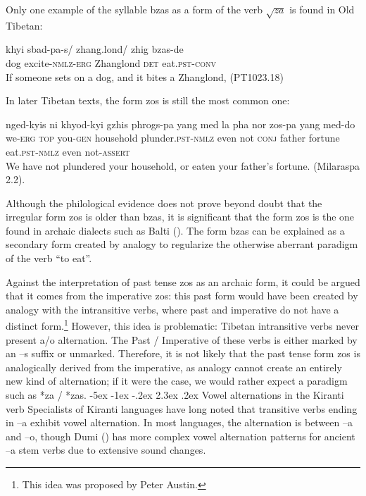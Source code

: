 \documentclass[oldfontcommands,twoside,a4paper,12pt]{memoir}
\makeatletter
\newcommand{\ipa}[1]{{\phon #1}}
\newcommand{\assert}{\textsc{assert}}
\newcommand{\conj}{\textsc{conj}}
\newcommand{\conv}{\textsc{conv}}
\newcommand{\detm}{\textsc{det}}
\newcommand{\erg}{\textsc{erg}}
\newcommand{\gen}{\textsc{gen}}
\newcommand{\nmlz}{\textsc{nmlz}}
\newcommand{\pst}{\textsc{pst}}
\newcommand{\topic}{\textsc{top}}
\newcommand{\racine}[1]{\begin{math}\sqrt{#1}\end{math}}
\newcommand{\titre}{}
\renewcommand\section{\@startsection{section}{0}{\z@}%
                                   {-5ex \@plus -1ex \@minus -.2ex}%
                                   {2.3ex \@plus.2ex}%
                                   {\flushleft\large\bfseries}}
\makeatother
\begin{document}
Only one example of the syllable \ipa{bzas} as a form of the verb \racine{za} is found in Old Tibetan:
\begin{exe}
\ex \label{bzas}
\gll khyi sbad-pa-s/ zhang.lond/ zhig bzas-de \\
	dog excite-\nmlz{}-\erg{} Zhanglond \detm{} eat.\pst{}-\conv{} \\
\glt If someone sets on a dog, and it bites a \ipa{Zhanglond}, (PT1023.18)
\end{exe}
In later Tibetan texts, the form \ipa{zos} is still the most common one:
\begin{exe}
\ex \label{bzas}
\gll nged-kyis ni khyod-kyi gzhis phrogs-pa yang med la pha nor zos-pa yang med-do \\
	we-\erg{} \topic{} you-\gen{} household plunder.\pst{}-\nmlz{} even not \conj{} father fortune eat.\pst{}-\nmlz{} even not-\assert{} \\
\glt We have not plundered your household, or  eaten your father's fortune. (Milaraspa 2.2).
\end{exe}
Although the philological evidence does not prove beyond doubt that the irregular form \ipa{zos} is older than \ipa{bzas}, it is significant that the form \ipa{zos} is the one found in archaic dialects such as Balti (\citealt[p. 234]{bielmeier85}). The form \ipa{bzas} can be explained as a secondary form created by analogy to regularize the otherwise aberrant paradigm of the verb ``to eat''. 

Against the interpretation of past tense \ipa{zos} as an archaic form, it could be argued that  it comes from the imperative \ipa{zos}: this past form would have been created by analogy with the intransitive verbs, where past and imperative do not have a distinct form.\footnote{This idea was proposed by Peter Austin.} However, this idea is problematic: Tibetan intransitive verbs never present a/o alternation. The Past / Imperative of these verbs is either marked by an --s suffix or unmarked. Therefore, it is not likely that the past tense form \ipa{zos} is analogically derived from the imperative, as analogy cannot create an entirely new kind of alternation; if it were the case, we would rather expect a paradigm such as *za / *zas.
 \renewcommand{\titre}{\textit{Himalayan Linguistics, Vol. 9(1)}}
\section{Vowel alternations in the Kiranti verb}
 Specialists of Kiranti languages have long noted that transitive verbs ending in --a exhibit vowel alternation. In most languages, the alternation is between --a and --o, though Dumi (\citealt{driem93dumi}) has more complex vowel alternation patterns for ancient --a stem verbs due to extensive sound changes. 
 
\end{document}
